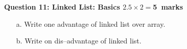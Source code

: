 \documentclass[12pt,a4paper]{article}
\def\Qeleven{5}
\begin{document}
\noindent\textbf{Question 11: Linked List: Basics \hfill $2.5\times 2=$\Qeleven~marks}\\
\begin{enumerate}
\item[a.] Write one advantage of linked list over array.
\begin{figure}[H]
\end{figure}
\item[b.] Write on dis--advantage of linked list.
\begin{figure}[H]
\end{figure}
\end{enumerate}
\end{document}
